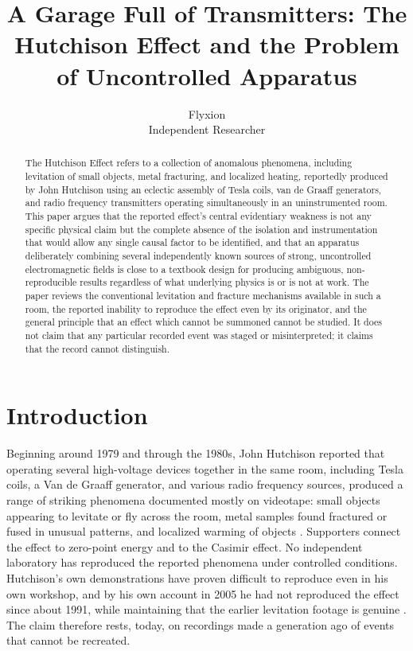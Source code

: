 \documentclass[11pt]{article}
\title{A Garage Full of Transmitters: The Hutchison Effect and the Problem of Uncontrolled Apparatus}
\author{Flyxion \\ \small Independent Researcher}
\date{}
\begin{document}
\maketitle

\begin{abstract}
The Hutchison Effect refers to a collection of anomalous phenomena, including levitation of small objects, metal fracturing, and localized heating, reportedly produced by John Hutchison using an eclectic assembly of Tesla coils, van de Graaff generators, and radio frequency transmitters operating simultaneously in an uninstrumented room. This paper argues that the reported effect's central evidentiary weakness is not any specific physical claim but the complete absence of the isolation and instrumentation that would allow any single causal factor to be identified, and that an apparatus deliberately combining several independently known sources of strong, uncontrolled electromagnetic fields is close to a textbook design for producing ambiguous, non-reproducible results regardless of what underlying physics is or is not at work. The paper reviews the conventional levitation and fracture mechanisms available in such a room, the reported inability to reproduce the effect even by its originator, and the general principle that an effect which cannot be summoned cannot be studied. It does not claim that any particular recorded event was staged or misinterpreted; it claims that the record cannot distinguish.
\end{abstract}

\section{Introduction}

Beginning around 1979 and through the 1980s, John Hutchison reported that operating several high-voltage devices together in the same room, including Tesla coils, a Van de Graaff generator, and various radio frequency sources, produced a range of striking phenomena documented mostly on videotape: small objects appearing to levitate or fly across the room, metal samples found fractured or fused in unusual patterns, and localized warming of objects \cite{SD}. Supporters connect the effect to zero-point energy and to the Casimir effect. No independent laboratory has reproduced the reported phenomena under controlled conditions. Hutchison's own demonstrations have proven difficult to reproduce even in his own workshop, and by his own account in 2005 he had not reproduced the effect since about 1991, while maintaining that the earlier levitation footage is genuine \cite{SD,W2006}. The claim therefore rests, today, on recordings made a generation ago of events that cannot be recreated.
\end{document}
